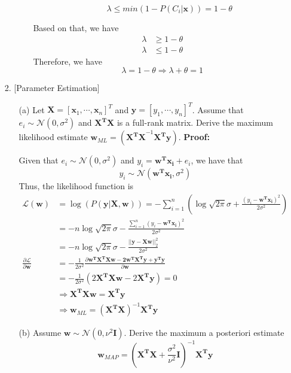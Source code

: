 \documentclass{article}
\renewcommand{\b}[1]{\bm{#1}}
\begin{document}
\begin{enumerate}
\begin{enumerate}
\begin{enumerate}
\begin{itemize}
                \[\lambda \leq min(1-P(C_i|\b{x}))=1-\theta\]
            \end{itemize}
            Based on that, we have 
            \begin{align*}
                \lambda &\geq 1-\theta\\
                \lambda &\leq 1-\theta
            \end{align*}
            Therefore, we have 
            \[\lambda = 1-\theta\Rightarrow \lambda + \theta = 1\]
        \end{enumerate}
    \end{enumerate}
    \item [2.] [Parameter Estimation]
    \begin{enumerate}
        \setlength\parindent{2em}
        \item [(a)] Let $\b{X} = [\b{x}_1,\cdots,\b{x}_n]^T$ and $\b{y} = [y_1, \cdots, y_n]^T$. Assume that $e_i\sim \mathcal{N}(0,\sigma^2)$ and $\b{X^TX}$ is a full-rank matrix. Derive the maximum likelihood estimate $\b{w}_{ML} = (\b{X^TX}^{-1}\b{X^Ty})$.\newline
        {\bf Proof:} 
        \par Given that $e_i\sim\mathcal{N}(0,\sigma^2)$ and $y_i = \b{w^Tx_i}+e_i$, we have that 
        \[y_i\sim\mathcal{N}(\b{w^Tx_i}, \sigma^2)\]
        Thus, the likelihood function is
        \begin{align*}
            \mathcal{L}(\b{w}) &= \log(P(\b{y|X,w})) =  -\sum_{i=1}^n\left(\log\sqrt{2\pi}\sigma + \frac{\left(y_i-\b{w^Tx_i}\right)^2}{2\sigma^2}\right)\\
            &= -n\log\sqrt{2\pi}\sigma - \frac{\sum_{i=1}^n\left(y_i-\b{w^Tx_i}\right)^2}{2\sigma^2}\\
            &= -n\log\sqrt{2\pi}\sigma - \frac{||\b{y-Xw}||_2^2}{2\sigma^2}\\
            \frac{\partial\mathcal{L}}{\partial \b{w}} &= -\frac{1}{2\sigma^2} \frac{\partial \b{w^TX^TXw-2w^TX^Ty+y^Ty}}{\partial \b{w}}\\
            &= -\frac{1}{2\sigma^2}\left(2\b{X^TXw}-2\b{X^Ty}\right) = 0\\
            &\Rightarrow \b{X^TXw} = \b{X^Ty}\\
            &\Rightarrow \b{w}_{ML} = \left(\b{X^TX}\right)^{-1}\b{X^Ty}
        \end{align*}
        \item [(b)] Assume $\b{w}\sim\mathcal{N}(0,\nu^2\b{I})$. Derive the maximum a posteriori estimate \[\b{w}_{MAP} = \left(\b{X^TX}+\frac{\sigma^2}{\nu^2}\b{I}\right)^{-1}\b{X^Ty}\]

\end{enumerate}
\end{enumerate}
\end{document}
